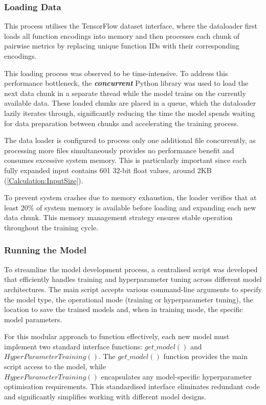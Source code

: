 \subsubsection{Loading Data}
This process utilises the TensorFlow dataset interface, where the dataloader first loads all function encodings into memory and then processes each chunk of pairwise metrics by replacing unique function IDs with their corresponding encodings.

This loading process was observed to be time-intensive. To address this performance bottleneck, the \textbf{\textit{concurrent}} Python library was used to load the next data chunk in a separate thread while the model trains on the currently available data. These loaded chunks are placed in a queue, which the dataloader lazily iterates through, significantly reducing the time the model spends waiting for data preparation between chunks and accelerating the training process.

The data loader is configured to process only one additional file concurrently, as processing more files simultaneously provides no performance benefit and consumes excessive system memory. This is particularly important since each fully expanded input contains 601 32-bit float values, around 2KB (\ref{Calculation:InputSize}).

To prevent system crashes due to memory exhaustion, the loader verifies that at least 20\% of system memory is available before loading and expanding each new data chunk. This memory management strategy ensures stable operation throughout the training cycle.

\subsubsection{Running the Model}
To streamline the model development process, a centralised script was developed that efficiently handles training and hyperparameter tuning across different model architectures. The main script accepts various command-line arguments to specify the model type, the operational mode (training or hyperparameter tuning), the location to save the trained models and, when in training mode, the specific model parameters.

For this modular approach to function effectively, each new model must implement two standard interface functions: $get\_model()$ and $HyperParameterTraining()$. The $get\_model()$ function provides the main script access to the model, while \\$HyperParameterTraining()$ encapsulates any model-specific hyperparameter optimisation requirements. This standardised interface eliminates redundant code and significantly simplifies working with different model designs.

